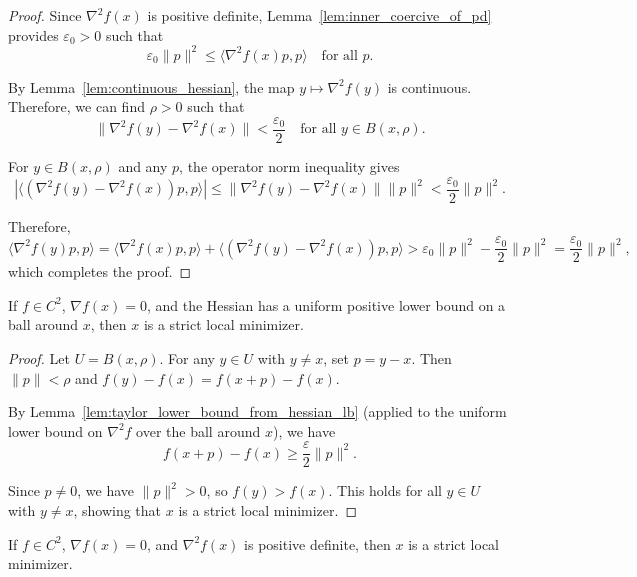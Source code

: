 \begin{proof}
  \leanok{}
  Since $\nabla^2 f(x)$ is positive definite, Lemma~\ref{lem:inner_coercive_of_pd} provides $\varepsilon_0 > 0$ such that
  \[
    \varepsilon_0 \|p\|^2 \le \langle \nabla^2 f(x) p, p \rangle \quad \text{for all } p.
  \]

  By Lemma~\ref{lem:continuous_hessian}, the map $y \mapsto \nabla^2 f(y)$ is continuous. Therefore, we can find $\rho > 0$ such that
  \[
    \|\nabla^2 f(y) - \nabla^2 f(x)\| < \frac{\varepsilon_0}{2} \quad \text{for all } y \in B(x,\rho).
  \]

  For $y \in B(x,\rho)$ and any $p$, the operator norm inequality gives
  \[
    \left| \langle (\nabla^2 f(y) - \nabla^2 f(x))p, p \rangle \right| \le \|\nabla^2 f(y) - \nabla^2 f(x)\| \|p\|^2 < \frac{\varepsilon_0}{2} \|p\|^2.
  \]

  Therefore,
  \[
    \langle \nabla^2 f(y)p, p\rangle = \langle \nabla^2 f(x) p, p \rangle + \langle (\nabla^2 f(y) - \nabla^2 f(x))p, p \rangle
    > \varepsilon_0 \|p\|^2 - \frac{\varepsilon_0}{2} \|p\|^2 = \frac{\varepsilon_0}{2} \|p\|^2,
  \]
  which completes the proof.
\end{proof}

\begin{theorem}\label{thm:strict_local_min_of_gradient_zero_hessian_uniform_lb}
  \leanok{}
  If $f\in C^2$, $\nabla f(x)=0$, and the Hessian has a uniform positive lower bound on a ball around $x$, then $x$ is a strict local minimizer.
\end{theorem}

\begin{proof}
  \leanok{}
  Let $U = B(x, \rho)$. For any $y \in U$ with $y \neq x$, set $p = y - x$. Then $\|p\| < \rho$ and
  $f(y) - f(x) = f(x+p) - f(x)$.

  By Lemma~\ref{lem:taylor_lower_bound_from_hessian_lb} (applied to the uniform lower bound on $\nabla^2 f$
  over the ball around $x$), we have
  \[
    f(x+p) - f(x) \ge \frac{\varepsilon}{2} \|p\|^2.
  \]

  Since $p \neq 0$, we have $\|p\|^2 > 0$, so $f(y) > f(x)$. This holds for all $y \in U$ with $y \neq x$,
  showing that $x$ is a strict local minimizer.
\end{proof}

\begin{theorem}\label{thm:second_order_sufficient_condition}
  \leanok{}
  If $f\in C^2$, $\nabla f(x)=0$, and $\nabla^2 f(x)$ is positive definite, then $x$ is a strict local minimizer.
\end{theorem}

